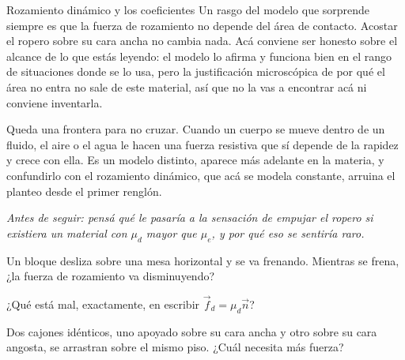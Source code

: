 \documentclass[11pt,openany]{book}
\begin{document}
\begin{bloque}{Rozamiento dinámico y los coeficientes}
Un rasgo del modelo que sorprende siempre es que la fuerza de rozamiento no depende del área de contacto. Acostar el ropero sobre su cara ancha no cambia nada. Acá conviene ser honesto sobre el alcance de lo que estás leyendo: el modelo lo afirma y funciona bien en el rango de situaciones donde se lo usa, pero la justificación microscópica de por qué el área no entra no sale de este material, así que no la vas a encontrar acá ni conviene inventarla.

Queda una frontera para no cruzar. Cuando un cuerpo se mueve dentro de un fluido, el aire o el agua le hacen una fuerza resistiva que sí depende de la rapidez y crece con ella. Es un modelo distinto, aparece más adelante en la materia, y confundirlo con el rozamiento dinámico, que acá se modela constante, arruina el planteo desde el primer renglón.

\textit{Antes de seguir: pensá qué le pasaría a la sensación de empujar el ropero si existiera un material con $\mu_d$ mayor que $\mu_e$, y por qué eso se sentiría raro.}
\end{bloque}

\begin{chequeo}
\item Un bloque desliza sobre una mesa horizontal y se va frenando. Mientras se frena, ¿la fuerza de rozamiento va disminuyendo?
\item ¿Qué está mal, exactamente, en escribir $\vec f_d = \mu_d \vec n$?
\item Dos cajones idénticos, uno apoyado sobre su cara ancha y otro sobre su cara angosta, se arrastran sobre el mismo piso. ¿Cuál necesita más fuerza?
\end{chequeo}
\end{document}
